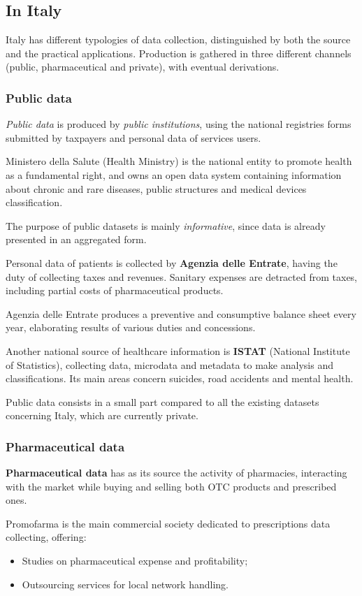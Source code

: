 \subsection{In Italy}
Italy has different typologies of data collection, distinguished by both the source and the practical applications. Production is gathered in three different channels (public, pharmaceutical and private), with eventual derivations.

\subsubsection{Public data}
\textit{Public data} is produced by \textit{public institutions}, using the national registries forms submitted by taxpayers and personal data of services users.

Ministero della Salute (Health Ministry) is the national entity to promote health as a fundamental right, and owns an open data system containing information about chronic and rare diseases, public structures and medical devices classification. 

The purpose of public datasets is mainly \textit{informative}, since data is already presented in an aggregated form.

Personal data of patients is collected by \textbf{Agenzia delle Entrate}, having the duty of collecting taxes and revenues. Sanitary expenses are detracted from taxes, including partial costs of pharmaceutical products. 

Agenzia delle Entrate produces a preventive and consumptive balance sheet every year, elaborating results of various duties and concessions.

Another national source of healthcare information is \textbf{ISTAT} (National Institute of Statistics), collecting data, microdata and metadata to make analysis and classifications. Its main areas concern suicides, road accidents and mental health.

Public data consists in a small part compared to all the existing datasets concerning Italy, which are currently private.

\subsubsection{Pharmaceutical data}
\textbf{Pharmaceutical data} has as its source the activity of pharmacies, interacting with the market while buying and selling both OTC products and prescribed ones.

Promofarma is the main commercial society dedicated to prescriptions data collecting, offering:
\begin{itemize}
	\item Studies on pharmaceutical expense and profitability;
	\item Outsourcing services for local network handling.
\end{itemize}

